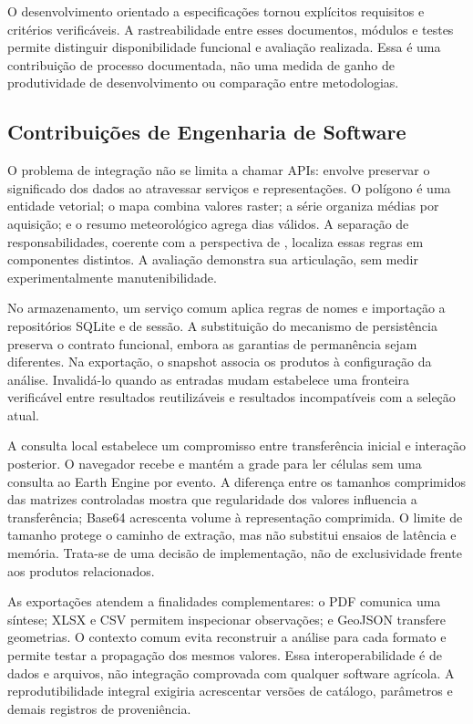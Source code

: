 O desenvolvimento orientado a especificações tornou explícitos requisitos e critérios verificáveis. A rastreabilidade entre esses documentos, módulos e testes permite distinguir disponibilidade funcional e avaliação realizada. Essa é uma contribuição de processo documentada, não uma medida de ganho de produtividade de desenvolvimento ou comparação entre metodologias.

\subsection{Contribuições de Engenharia de Software}

O problema de integração não se limita a chamar APIs: envolve preservar o significado dos dados ao atravessar serviços e representações. O polígono é uma entidade vetorial; o mapa combina valores raster; a série organiza médias por aquisição; e o resumo meteorológico agrega dias válidos. A separação de responsabilidades, coerente com a perspectiva de \citet{PARNAS1972}, localiza essas regras em componentes distintos. A avaliação demonstra sua articulação, sem medir experimentalmente manutenibilidade.

No armazenamento, um serviço comum aplica regras de nomes e importação a repositórios SQLite e de sessão. A substituição do mecanismo de persistência preserva o contrato funcional, embora as garantias de permanência sejam diferentes. Na exportação, o snapshot associa os produtos à configuração da análise. Invalidá-lo quando as entradas mudam estabelece uma fronteira verificável entre resultados reutilizáveis e resultados incompatíveis com a seleção atual.

A consulta local estabelece um compromisso entre transferência inicial e interação posterior. O navegador recebe e mantém a grade para ler células sem uma consulta ao Earth Engine por evento. A diferença entre os tamanhos comprimidos das matrizes controladas mostra que regularidade dos valores influencia a transferência; Base64 acrescenta volume à representação comprimida. O limite de tamanho protege o caminho de extração, mas não substitui ensaios de latência e memória. Trata-se de uma decisão de implementação, não de exclusividade frente aos produtos relacionados.

As exportações atendem a finalidades complementares: o PDF comunica uma síntese; XLSX e CSV permitem inspecionar observações; e GeoJSON transfere geometrias. O contexto comum evita reconstruir a análise para cada formato e permite testar a propagação dos mesmos valores. Essa interoperabilidade é de dados e arquivos, não integração comprovada com qualquer software agrícola. A reprodutibilidade integral exigiria acrescentar versões de catálogo, parâmetros e demais registros de proveniência.

